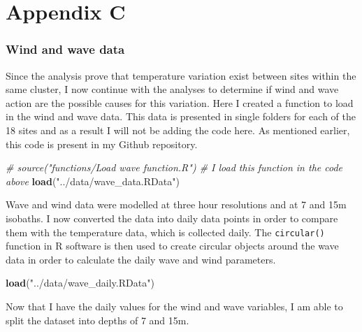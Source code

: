 \documentclass[10pt,a4,]{article}
\newenvironment{Shaded}{\begin{snugshade}}{\end{snugshade}}
\newcommand{\CommentTok}[1]{\textcolor[rgb]{0.56,0.35,0.01}{\textit{#1}}}
\newcommand{\KeywordTok}[1]{\textcolor[rgb]{0.13,0.29,0.53}{\textbf{#1}}}
\newcommand{\NormalTok}[1]{#1}
\newcommand{\OperatorTok}[1]{\textcolor[rgb]{0.81,0.36,0.00}{\textbf{#1}}}
\newcommand{\StringTok}[1]{\textcolor[rgb]{0.31,0.60,0.02}{#1}}
\begin{document}
\section*{\large{Appendix C}}
\subsubsection*{Wind and wave data}

Since the analysis prove that temperature variation exist between sites
within the same cluster, I now continue with the analyses to determine
if wind and wave action are the possible causes for this variation. Here
I created a function to load in the wind and wave data. This data is
presented in single folders for each of the 18 sites and as a result I
will not be adding the code here. As mentioned earlier, this code is
present in my Github repository.

\begin{Shaded}
\begin{Highlighting}[]
\CommentTok{# source("functions/Load wave function.R") # I load this function in the code above}
\KeywordTok{load}\NormalTok{(}\StringTok{"../data/wave_data.RData"}\NormalTok{)}
\end{Highlighting}
\end{Shaded}

Wave and wind data were modelled at three hour resolutions and at 7 and
15m isobaths. I now converted the data into daily data points in order
to compare them with the temperature data, which is collected daily. The
\texttt{circular()} function in R software is then used to create
circular objects around the wave data in order to calculate the daily
wave and wind parameters.

\begin{Shaded}
\begin{Highlighting}[]
\KeywordTok{load}\NormalTok{(}\StringTok{"../data/wave_daily.RData"}\NormalTok{)}
\end{Highlighting}
\end{Shaded}

Now that I have the daily values for the wind and wave variables, I am
able to split the dataset into depths of 7 and 15m.

\begin{Shaded}
\end{Shaded}
\end{document}
